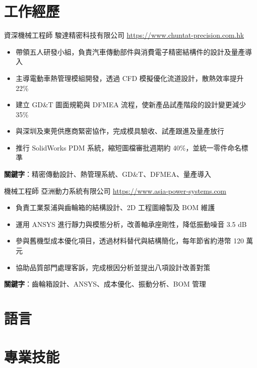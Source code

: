 \documentclass[a4paper, serif, 10pt]{moderncv}
\begin{document}
\section{工作經歷}

        {資深機械工程師}
        {駿達精密科技有限公司}
        {\url{https://www.chuntat-precision.com.hk}}
        {}
        {\begin{itemize}
\item 帶領五人研發小組，負責汽車傳動部件與消費電子精密結構件的設計及量產導入
\item 主導電動車熱管理模組開發，透過 CFD 模擬優化流道設計，散熱效率提升 22\%
\item 建立 GD\&T 圖面規範與 DFMEA 流程，使新產品試產階段的設計變更減少 35\%
\item 與深圳及東莞供應商緊密協作，完成模具驗收、試產跟進及量產放行
\item 推行 SolidWorks PDM 系統，縮短圖檔審批週期約 40\%，並統一零件命名標準
\end{itemize}
\textbf{關鍵字}：精密傳動設計、熱管理系統、GD\&T、DFMEA、量產導入}

        {機械工程師}
        {亞洲動力系統有限公司}
        {\url{https://www.asia-power-systems.com}}
        {}
        {\begin{itemize}
\item 負責工業泵浦與齒輪箱的結構設計、2D 工程圖繪製及 BOM 維護
\item 運用 ANSYS 進行靜力與模態分析，改善軸承座剛性，降低振動噪音 3.5 dB
\item 參與舊機型成本優化項目，透過材料替代與結構簡化，每年節省約港幣 120 萬元
\item 協助品質部門處理客訴，完成根因分析並提出八項設計改善對策
\end{itemize}
\textbf{關鍵字}：齒輪箱設計、ANSYS、成本優化、振動分析、BOM 管理}
\section{語言}

\section{專業技能}
\end{document}
